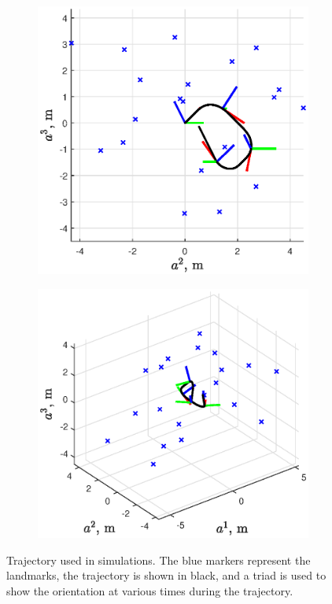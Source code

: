 \begin{figure}
        \begin{subfigure}[b]{0.495\textwidth}   
            \centering 
            \includegraphics[width=\textwidth]{figs/batch/traj_yz.eps}  
        \end{subfigure}
        \hfill
        \begin{subfigure}[b]{0.495\textwidth}   
            \centering 
            \includegraphics[width=\textwidth]{figs/batch/traj.eps} 
        \end{subfigure} 
	\caption[Trajectory used in simulations.]{Trajectory used in simulations. The blue markers represent the landmarks, the trajectory is shown in black, and a triad is used to show the orientation at various times during the trajectory.}
	\label{fig:batch_traj}
\end{figure}

